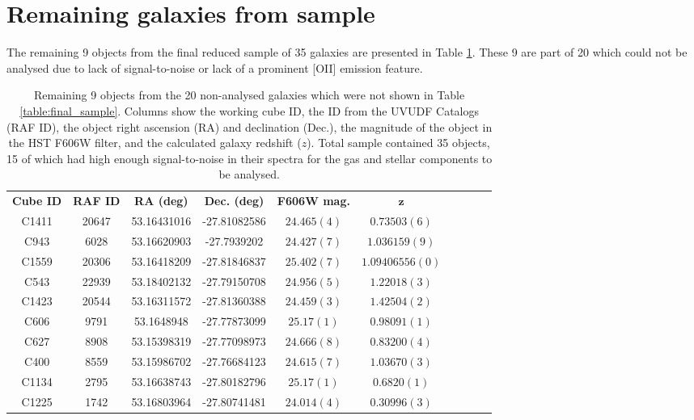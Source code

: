 \documentclass[12pt, twocolumn]{revtex4-1}    %
\begin{document}
\section{Remaining galaxies from sample} \label{appendix:rest_of_final_sample}
\noindent
The remaining 9 objects from the final reduced sample of 35 galaxies are presented in Table \ref{table:rest_of_final_sample}. These 9 are part of 20 which could not be analysed due to lack of signal-to-noise or lack of a prominent [OII] emission feature.

\begin{table}[h!]
\centering
\begin{tabular}{c@{\hskip 10pt}c@{\hskip 10pt}c@{\hskip 10pt}c@{\hskip 10pt}c@{\hskip 10pt}c@{\hskip 10pt}c@{\hskip 10pt}c@{\hskip 10pt}c@{\hskip 10pt}c} 
 \hline
 \textbf{Cube ID} & \textbf{RAF ID} & \textbf{RA (deg)} & \textbf{Dec. (deg)} & \textbf{F606W mag.} & \textbf{$\boldsymbol{z}$}  \\ [0.5ex] 
C1411 & 20647 & 53.16431016 & -27.81082586 & $24.465(4)$ & $0.73503(6)$ \\ 

C943 & 6028 & 53.16620903 & -27.7939202 & $24.427(7)$ & $1.036159(9)$ \\ 

C1559 & 20306 & 53.16418209 & -27.81846837 & $25.402(7)$ & $1.09406556(0)$ \\ 

C543 & 22939 & 53.18402132 & -27.79150708 & $24.956(5)$ & $1.22018(3)$ \\ 

C1423 & 20544 & 53.16311572 & -27.81360388 & $24.459(3)$ & $1.42504(2)$ \\ 

C606 & 9791 & 53.1648948 & -27.77873099 & $25.17(1)$ & $0.98091(1)$ \\ 

C627 & 8908 & 53.15398319 & -27.77098973 & $24.666(8)$ & $0.83200(4)$ \\ 

C400 & 8559 & 53.15986702 & -27.76684123 & $24.615(7)$ & $1.03670(3)$ \\ 

C1134 & 2795 & 53.16638743 & -27.80182796 & $25.17(1)$ & $0.6820(1)$ \\ 

C1225 & 1742 & 53.16803964 & -27.80741481 & $24.014(4)$ & $0.30996(3)$ \\ 
 \hline
\end{tabular}
\caption{Remaining 9 objects from the 20 non-analysed galaxies which were not shown in Table \ref{table:final_sample}. Columns show the working cube ID, the ID from the UVUDF Catalogs \citep{2015AJ....150...31R} (RAF ID), the object right ascension (RA) and declination (Dec.), the magnitude of the object in the HST F606W filter, and the calculated galaxy redshift ($z$). Total sample contained 35 objects, 15 of which had high enough signal-to-noise in their spectra for the gas and stellar components to be analysed.}
\label{table:rest_of_final_sample}
\end{table}
\end{document}
